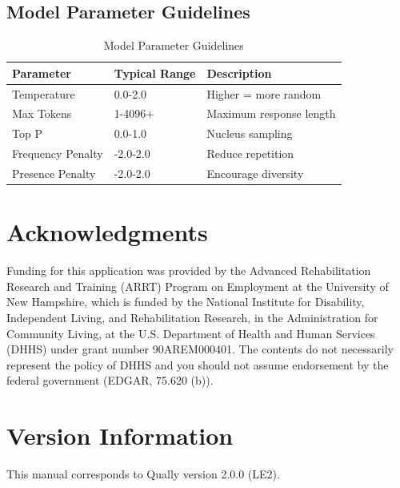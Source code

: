 \documentclass[11pt,a4paper]{article}
\begin{document}
\subsection{Model Parameter Guidelines}
\begin{table}[ht]
\centering
\begin{tabular}{lll}
\toprule
Parameter & Typical Range & Description \\
\midrule
Temperature & 0.0-2.0 & Higher = more random \\
Max Tokens & 1-4096+ & Maximum response length \\
Top P & 0.0-1.0 & Nucleus sampling \\
Frequency Penalty & -2.0-2.0 & Reduce repetition \\
Presence Penalty & -2.0-2.0 & Encourage diversity \\
\bottomrule
\end{tabular}
\caption{Model Parameter Guidelines}
\label{tab:parameters}
\end{table}

\section*{Acknowledgments}
Funding for this application was provided by the Advanced Rehabilitation Research and Training (ARRT) Program on Employment at the University of New Hampshire, which is funded by the National Institute for Disability, Independent Living, and Rehabilitation Research, in the Administration for Community Living, at the U.S. Department of Health and Human Services (DHHS) under grant number 90AREM000401. The contents do not necessarily represent the policy of DHHS and you should not assume endorsement by the federal government (EDGAR, 75.620 (b)).

\section*{Version Information}
This manual corresponds to Qually version 2.0.0 (LE2).
\end{document}
